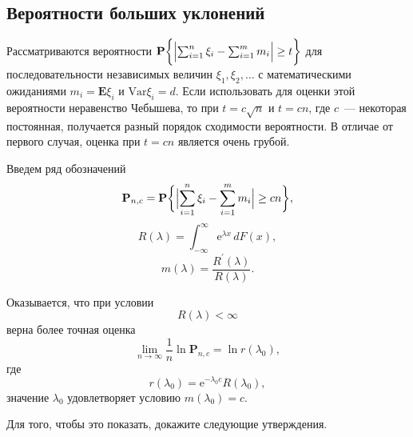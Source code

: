 \subsection{Вероятности больших уклонений}


Рассматриваются вероятности $\mathbf{P}\biggl\{\Bigl|\sum_{i=1}^n\xi_i -\sum_{i=1}^m m_i\Bigr|\geq t\biggr\}$ для последовательности независимых величин $\xi_1,\xi_2,\dots$ с математическими ожиданиями $m_i = \mathbf{E} \xi_i$ и $\text{Var} \xi_i = d$. 
Если использовать для оценки этой вероятности неравенство Чебышева, то при $t = c\sqrt{n}$ и $t=cn$, где $c$~--- некоторая постоянная, получается разный порядок сходимости вероятности. В отличае от первого случая, оценка при $t=cn$ является очень грубой. 

\medskip 

Введем ряд обозначений
\begin{equation*}
\mathbf{P}_{n,c} = \mathbf{P}\biggl\{\Bigl|\sum_{i=1}^n\xi_i -\sum_{i=1}^m m_i\Bigr|\geq cn\biggr\},
\end{equation*}
\begin{equation*}
R(\lambda)=\int_{-\infty}^{\infty}\text{e}^{\lambda x}\,d F(x),
\end{equation*}
\begin{equation*}
m(\lambda) = \frac{R^{\prime}(\lambda)}{R(\lambda)}.
\end{equation*}

\medskip

Оказывается, что при условии 
\begin{equation}
R(\lambda)<\infty
\label{condition.R}
\end{equation}
верна более точная оценка 
\begin{equation*}
\lim_{n\to\infty}\frac{1}{n}\ln \mathbf{P}_{n,c} =\ln r(\lambda_0),
\end{equation*}
где 
\begin{equation*}
r(\lambda_0) = \text{e}^{-\lambda_0 c}R(\lambda_0),
\end{equation*}
значение $\lambda_0$ удовлетворяет условию  $m(\lambda_0) = c$.

\medskip

Для того, чтобы это показать, докажите следующие утверждения.

